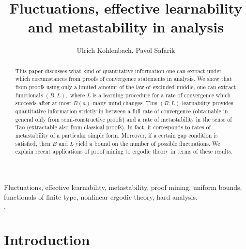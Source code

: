 \documentclass[1p]{elsarticle}
\theoremstyle{plain}
\theoremstyle{definition}
\theoremstyle{remark}
\theoremstyle{definition}
\begin{document}


\title{Fluctuations, effective learnability and metastability in analysis}
\author{Ulrich Kohlenbach, Pavol Safarik}
\address{Department of Mathematics, Technische Universit\"at Darmstadt, Schlossgartenstra{\ss}e 7, 64289 Darmstadt, Germany\\[1mm] 
Dedicated to Professor Sergei Artemov on the occasion of his 60th birthday}

\date{}

\begin{abstract}
This paper discusses what kind of quantitative information one can extract 
under which circumstances from proofs of convergence statements in analysis. 
We show that from proofs using only a limited amount of the 
law-of-excluded-middle, 
one can extract functionals $(B,L),$ where $L$ is a learning procedure for 
a rate of convergence which succeeds after at most $B(a)$-many mind changes. 
This $(B,L)$-learnability provides quantitative information strictly in 
between a full rate of convergence (obtainable in general only from 
semi-constructive proofs) and a rate of metastability in the sense of Tao 
(extractable also from classical proofs). In fact, it corresponds to rates 
of metastability of a particular simple form. Moreover, 
if a certain gap condition is satisfied, then $B$ and $L$ yield a bound on 
the number of possible fluctuations. We explain recent 
applications of proof mining to ergodic theory in terms of these results. 
\end{abstract}

\begin{keyword}
Fluctuations, effective learnability, metastability, proof mining, uniform 
bounds, functionals of finite type, nonlinear ergodic theory, hard analysis.\\
.
\end{keyword}


\maketitle


\section{Introduction}

\newtheorem{definition}{Definition}[section]
\newtheorem{proposition}[definition]{Proposition}
\newtheorem{theorem}[definition]{Theorem}
\newtheorem{corollary}[definition]{Corollary}
\newtheorem{exercise}[definition]{Exercise}
\newtheorem{clm}[definition]{Claim}
\newtheorem{example}[definition]{Example}
\newtheorem{notation}[definition]{Notation}
\newtheorem{application}[definition]{Application} 
\end{document}
